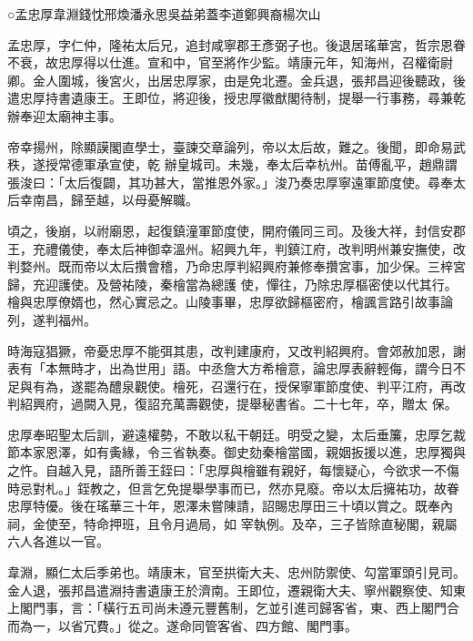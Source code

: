 
\begin{pinyinscope}

 ○孟忠厚韋淵錢忱邢煥潘永思吳益弟蓋李道鄭興裔楊次山



 孟忠厚，字仁仲，隆祐太后兄，追封咸寧郡王彥弼子也。後退居瑤華宮，哲宗恩眷不衰，故忠厚得以仕進。宣和中，官至將作少監。靖康元年，知海州，召權衛尉卿。金人圍城，後宮火，出居忠厚家，由是免北遷。金兵退，張邦昌迎後聽政，後遣忠厚持書遺康王。王即位，將迎後，授忠厚徽猷閣待制，提舉一行事務，尋兼乾辦奉迎太廟神主事。



 帝幸揚州，除顯謨閣直學士，臺諫交章論列，帝以太后故，難之。後聞，即命易武秩，遂授常德軍承宣使，乾
 辦皇城司。未幾，奉太后幸杭州。苗傅亂平，趙鼎謂張浚曰：「太后復闢，其功甚大，當推恩外家。」浚乃奏忠厚寧遠軍節度使。尋奉太后幸南昌，歸至越，以母憂解職。



 頃之，後崩，以祔廟恩，起復鎮潼軍節度使，開府儀同三司。及後大祥，封信安郡王，充禮儀使，奉太后神御幸溫州。紹興九年，判鎮江府，改判明州兼安撫使，改判婺州。既而帝以太后攢會稽，乃命忠厚判紹興府兼修奉攢宮事，加少保。三梓宮歸，充迎護使。及營祐陵，秦檜當為總護
 使，憚往，乃除忠厚樞密使以代其行。檜與忠厚僚婿也，然心實忌之。山陵事畢，忠厚欲歸樞密府，檜諷言路引故事論列，遂判福州。



 時海寇猖獗，帝憂忠厚不能弭其患，改判建康府，又改判紹興府。會郊赦加恩，謝表有「本無時才，出為世用」語。中丞詹大方希檜意，論忠厚表辭輕侮，謂今日不足與有為，遂罷為醴泉觀使。檜死，召還行在，授保寧軍節度使、判平江府，再改判紹興府，過闕入見，復詔充萬壽觀使，提舉秘書省。二十七年，卒，贈太
 保。



 忠厚奉昭聖太后訓，避遠權勢，不敢以私干朝廷。明受之變，太后垂簾，忠厚乞裁節本家恩澤，如有夤緣，令三省執奏。御史劾秦檜當國，親姻扳援以進，忠厚獨與之忤。自越入見，語所善王銍曰：「忠厚與檜雖有親好，每懷疑心，今欲求一不傷時忌對札。」銍教之，但言乞免提舉學事而已，然亦見廢。帝以太后擁祐功，故眷忠厚特優。後在瑤華三十年，恩澤未嘗陳請，詔賜忠厚田三十頃以賞之。既奉內祠，金使至，特命押班，且令月過局，如
 宰執例。及卒，三子皆除直秘閣，親屬六人各進以一官。



 韋淵，顯仁太后季弟也。靖康末，官至拱衛大夫、忠州防禦使、勾當軍頭引見司。金人退，張邦昌遣淵持書遺康王於濟南。王即位，遷親衛大夫、寧州觀察使、知東上閣門事，言：「橫行五司尚未遵元豐舊制，乞並引進司歸客省，東、西上閣門合而為一，以省冗費。」從之。遂命同管客省、四方館、閣門事。




\end{pinyinscope}
